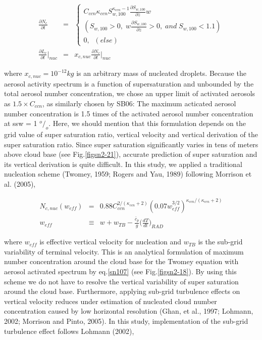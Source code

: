 \begin{eqnarray}
\frac{\partial N_{c}}{\partial t}&=&
\left\{
\begin{array}{l}
C_{ccn}\kappa_{ccn}S_{w,100}^{\kappa_{ccn}-1}\frac{\partial S_{w,100}}{\partial z}w\nonumber\\
(S_{w,100}>0,\;w\frac{\partial S_{w,100}}{\partial z}>0,\;and\;S_{w,100}<1.1) \nonumber\\
0,\;\;(else) 
\end{array}
\right.\\
\label{sn108}
\frac{\partial L_{c}}{\partial t}\Bigr|_{nuc}&=&x_{c,nuc}\frac{\partial N_{c}}{\partial t}\Bigr|_{nuc}\label{sn109}
\end{eqnarray}

where $x_{c,nuc} = 10^{-12} kg$ is an arbitrary mass of nucleated droplets. Because the aerosol activity spectrum is a function of supersaturation and unbounded by the total aerosol number concentration, we chose an upper limit of activated aerosols as $1.5 \times C_{ccn}$, as similarly chosen by SB06: The maximum acticated aerosol number concentration is 1.5 times of the activated aerosol number concentration at ssw = 1 $^{o}/_{o}$. Here, we should mention that this formulation depends on the grid value of super saturation ratio, vertical velocity and vertical derivation of the super saturation ratio. Since super saturation significantly varies in tens of meters above cloud base (see Fig.\ref{figsn2-21}), accurate prediction of super saturation and its vertical derivation is quite difficult. In this study, we applied a traditional nucleation scheme (Twomey, 1959; Rogers and Yau, 1989) following Morrison et al. (2005),

\begin{eqnarray}
N_{c,nuc}(w_{eff})&=&0.88C_{ccn}^{2/(\kappa_{ccn}+2)}(0.07w_{eff}^{3/2})^{\kappa_{ccn}/(\kappa_{ccn}+2)}\label{sn110}\\
w_{eff}&\equiv&w+w_{TB}-\frac{\bar{c}_{p}}{g}\bigl(\frac{dT}{dt}\bigr)_{RAD}\label{sn111}
\end{eqnarray}

where $w_{eff}$ is effective vertical velocity for nucleation and $w_{TB}$ is the sub-grid variability of terminal velocity. This is an analytical formulation of maximum number concentration around the cloud base for the Twomey equation with aerosol activated spectrum by eq.\ref{sn107} (see Fig.\ref{figsn2-18}). By using this scheme we do not have to resolve the vertical variability of super saturation around the cloud base. Furthermore, applying sub-grid turbulence effects on vertical velocity reduces under estimation of nucleated cloud number concentration caused by low horizontal resolution (Ghan, et al., 1997; Lohmann, 2002; Morrison and Pinto, 2005). In this study, implementation of the sub-grid turbulence effect follows Lohmann (2002),


